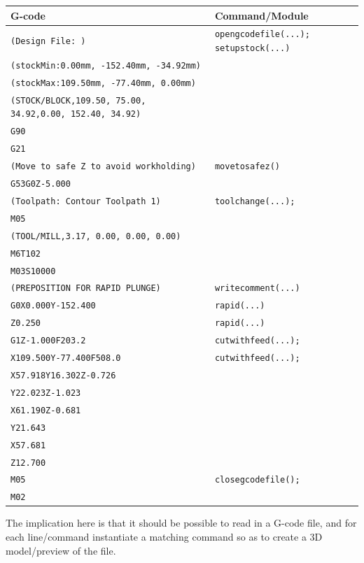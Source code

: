 \documentclass{ltxdoc}
\begin{document}
\noindent \begin{tabular}{@{}ll@{}} \toprule
 G-code                                                           & Command/Module \\ \midrule
 \verb|(Design File: )| &  \texttt{opengcodefile(...);}
                           \texttt{setupstock(...)}\\
 \verb|(stockMin:0.00mm, -152.40mm, -34.92mm)| \\
 \verb|(stockMax:109.50mm, -77.40mm, 0.00mm)| \\
 \verb|(STOCK/BLOCK,109.50, 75.00, 34.92,0.00, 152.40, 34.92)| \\
 \verb|G90| \\
 \verb|G21| \\ \midrule
 \verb|(Move to safe Z to avoid workholding)| &  \texttt{movetosafez()} \\
 \verb|G53G0Z-5.000| \\ \midrule
 \verb|(Toolpath: Contour Toolpath 1)| &  \texttt{toolchange(...);}\\
 \verb|M05| \\
 \verb|(TOOL/MILL,3.17, 0.00, 0.00, 0.00)| \\
 \verb|M6T102| \\
 \verb|M03S10000|  \\ \midrule
 \verb|(PREPOSITION FOR RAPID PLUNGE)| & \texttt{writecomment(...)}\\ \midrule
 \verb|G0X0.000Y-152.400| & \texttt{rapid(...)}\\
 \verb|Z0.250| & \texttt{rapid(...)}\\ \midrule
 \verb|G1Z-1.000F203.2| & \texttt{cutwithfeed(...);}\\  
 \verb|X109.500Y-77.400F508.0| & \texttt{cutwithfeed(...);} \\ 
 \verb|X57.918Y16.302Z-0.726|\\ 
 \verb|Y22.023Z-1.023|\\ 
 \verb|X61.190Z-0.681|\\ 
 \verb|Y21.643|\\ 
 \verb|X57.681|\\
 \verb|Z12.700|\\ \midrule
 \verb|M05| &  \texttt{closegcodefile();}\\
 \verb|M02|\\
 \bottomrule
 \end{tabular}
\bigskip

The implication here is that it should be possible to read in a G-code file, and for each
line/command instantiate a matching command so as to create a 3D model/preview of the file.
\end{document}
